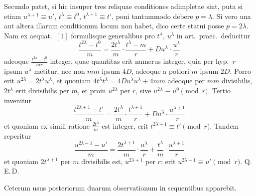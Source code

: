 \documentclass[12pt,a4paper]{article}
\theoremstyle{plain}
\theoremstyle{definition}
\theoremstyle{remark}
\begin{document}
Secundo patet, si hic insuper tres reliquae conditiones adimpletae sint, puta si etiam $u^{\lambda+1} \equiv u'$, $t^\lambda \equiv t^0$, $t^{\lambda+1} \equiv t'$, poni tantummodo debere $p=\lambda$. Si vero una aut altera illarum conditionum locum non habet, dico certe statui posse $p=2\lambda$. Nam ex aequat.\ $[1]$ formulisque generalibus pro $t^\lambda$, $u^\lambda$ in art.\ praec.\ deducitur
\[
\frac{t^{2\lambda}-t^0}{m} = \frac{2t^\lambda}{m} \cdot \frac{t^\lambda-m}{r} + Du^\lambda \cdot \frac{u^\lambda}{r}
\]
adeoque $\frac{t^{2\lambda}-t^0}{mr}$ integer, quae quantitas erit numerus integer, quia per hyp.\ $r$ ipsum $u^\lambda$ metitur, nec non $mm$ ipsum $4D$, adeoque a potiori $m$ ipsum $2D$. Porro erit $u^{2\lambda} = 2t^\lambda u^\lambda$, et quoniam $4t^\lambda t^\lambda = 4Du^\lambda u^\lambda + 4mm$ adeoque per $mm$ divisibilis, $2t^\lambda$ erit divisibilis per $m$, et proin $u^{2\lambda}$ per $r$, sive $u^{2\lambda} \equiv u^0 \pmod{r}$. Tertio invenitur
\[
\frac{t^{2\lambda+1}-t'}{m} = \frac{2t^\lambda}{m} \cdot \frac{t^{\lambda+1}}{r} + Du^\lambda \cdot \frac{u^{\lambda+1}}{r}
\]
et quoniam ex simili ratione $\frac{2t^\lambda}{m}$ est integer, erit $t^{2\lambda+1} \equiv t' \pmod{r}$. Tandem reperitur
\[
\frac{u^{2\lambda+1}-u'}{m} = \frac{2t^{\lambda+1}}{m} \cdot \frac{u^\lambda}{r} + \frac{t^\lambda}{m} \cdot \frac{u^{\lambda+1}}{r}
\]
et quoniam $2t^{\lambda+1}$ per $m$ divisibilis est, $u^{2\lambda+1}$ per $r$: erit $u^{2\lambda+1} \equiv u' \pmod{r}$. Q.\,E.\,D.

Ceterum usus posteriorum duarum observationum in sequentibus apparebit.
\end{document}
